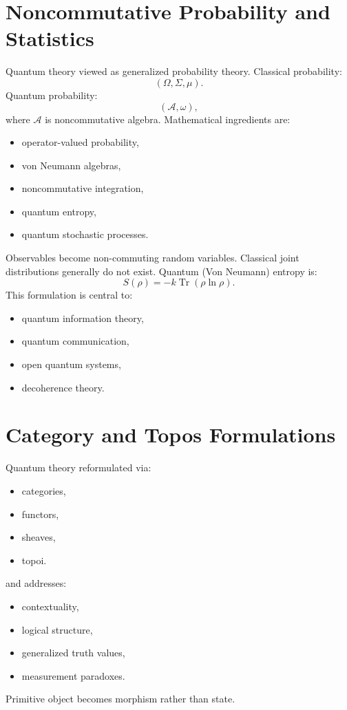 \section{Noncommutative Probability and Statistics}
\label{qmf:np}
Quantum theory viewed as generalized probability theory.
Classical probability:
\[(\Omega,\Sigma,\mu).\]
Quantum probability:
\[(\mathcal A,\omega),\]
where $\mathcal A$ is noncommutative algebra.
Mathematical ingredients are:
\begin{itemize}
\item operator-valued probability,
\item von Neumann algebras,
\item noncommutative integration,
\item quantum entropy,
\item quantum stochastic processes.
\end{itemize}
Observables become non-commuting random variables.
Classical joint distributions generally do not exist.
Quantum (Von Neumann) entropy is:
\[S(\rho)=-k \operatorname{Tr}(\rho \ln \rho).\]
This formulation is central to:
\begin{itemize}
\item quantum information theory,
\item quantum communication,
\item open quantum systems,
\item decoherence theory.
\end{itemize}

\section{Category and Topos Formulations}
\label{qmf:cat}
Quantum theory reformulated via:
\begin{itemize}
\item categories,
\item functors,
\item sheaves,
\item topoi.
\end{itemize}
and addresses:
\begin{itemize}
\item contextuality,
\item logical structure,
\item generalized truth values,
\item measurement paradoxes.
\end{itemize}
Primitive object becomes morphism rather than state.

